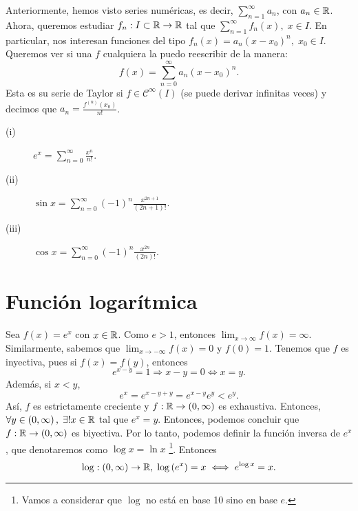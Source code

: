 Anteriormente, hemos visto series numéricas, es decir, $\displaystyle \sum^{\infty}_{n = 1}a_{n} $, con $\displaystyle a_{n} \in \mathbb{R} $. Ahora, queremos estudiar $\displaystyle f_{n} : I \subset \mathbb{R} \to \mathbb{R} $ tal que $\displaystyle \sum^{\infty}_{n = 1}f_{n}\left(x\right), \; x \in I $. En particular, nos interesan funciones del tipo $\displaystyle f_{n}\left(x\right) = a_{n}\left(x-x_{0}\right)^{n}, \; x_{0} \in I $. Queremos ver si una $\displaystyle f $ cualquiera la puedo reescribir de la manera:
\[f\left(x\right) = \sum^{\infty}_{ n = 0}a_{n}\left(x-x_{0}\right)^{n} .\]
Esta es su serie de Taylor si $\displaystyle f \in \mathcal{C}^{\infty}\left(I\right) $ (se puede derivar infinitas veces) y decimos que $\displaystyle a_{n} = \frac{ f^{\left(n\right)}\left(x_{0}\right)}{n!}$.
\begin{eg}
\normalfont 
\begin{description}
\item[(i)] $\displaystyle e^{x} = \sum^{\infty}_{n = 0}\frac{x^{n}}{n!} $.
\item[(ii)] $\displaystyle \sin x = \sum^{\infty}_{n = 0}\left(-1\right)^{n}\frac{x^{2n+1}}{\left(2n+1\right)!} $.
\item[(iii)] $\displaystyle \cos x = \sum^{\infty}_{ n = 0}\left(-1\right)^{n}\frac{x^{2n}}{\left(2n\right)!}$.
\end{description}
\end{eg}

\chapter{Función logarítmica}

Sea $\displaystyle f\left(x\right) = e^{x} $ con $\displaystyle x \in \mathbb{R} $. Como $\displaystyle e > 1 $, entonces $\displaystyle \lim_{x \to \infty}f\left(x\right)=\infty $. Similarmente, sabemos que $\displaystyle \lim_{x \to -\infty}f\left(x\right) = 0 $ y $\displaystyle f\left(0\right) = 1 $. Tenemos que $\displaystyle f $ es inyectiva, pues si $\displaystyle f\left(x\right) = f\left(y\right) $, entonces
\[e^{x-y} = 1 \Rightarrow x - y = 0 \iff x = y .\]
Además, si $\displaystyle x < y $, 
\[e^{x} = e^{x-y+y} = e^{x-y}e^{y} < e^{y} .\]
Así, $\displaystyle f $ es estrictamente creciente y $\displaystyle f: \mathbb{R} \to \left(0, \infty\right) $ es exhaustiva. Entonces, $\displaystyle \forall y \in \left(0, \infty\right), \; \exists!x \in \mathbb{R} $ tal que $\displaystyle e^{x} = y $. Entonces, podemos concluir que $\displaystyle f: \mathbb{R} \to \left(0, \infty\right) $ es biyectiva. Por lo tanto, podemos definir la función inversa de $\displaystyle e^{x} $, que denotaremos como $\displaystyle \log x = \ln x $  \footnote{Vamos a considerar que $\displaystyle \log  $ no está en base 10 sino en base $\displaystyle e $.}. Entonces
\[\log:\left(0,\infty\right) \to \mathbb{R}, \; \log\left(e^{x}\right) = x \iff e^{\log x } = x .\]

